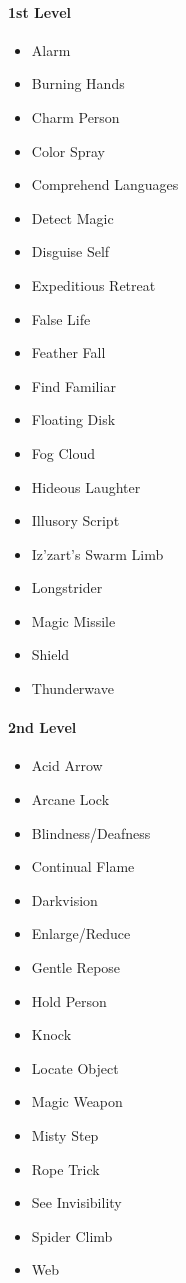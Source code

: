 \paragraph{1st Level}\label{_1st_level_2}

\begin{itemize}
\item
  Alarm
\item
  Burning Hands
\item
  Charm Person
\item
  Color Spray
\item
  Comprehend Languages
\item
  Detect Magic
\item
  Disguise Self
\item
  Expeditious Retreat
\item
  False Life
\item
  Feather Fall
\item
  Find Familiar
\item
  Floating Disk
\item
  Fog Cloud
\item
  Hideous Laughter
\item
  Illusory Script
\item
  Iz'zart's Swarm Limb
\item
  Longstrider
\item
  Magic Missile
\item
  Shield
\item
  Thunderwave
\end{itemize}

\paragraph{2nd Level}\label{_2nd_level_2}

\begin{itemize}
\item
  Acid Arrow
\item
  Arcane Lock
\item
  Blindness/Deafness
\item
  Continual Flame
\item
  Darkvision
\item
  Enlarge/Reduce
\item
  Gentle Repose
\item
  Hold Person
\item
  Knock
\item
  Locate Object
\item
  Magic Weapon
\item
  Misty Step
\item
  Rope Trick
\item
  See Invisibility
\item
  Spider Climb
\item
  Web
\end{itemize}

